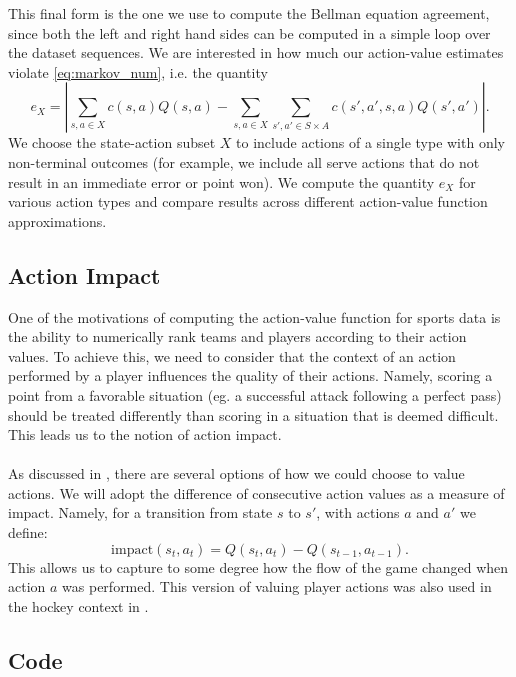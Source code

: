 \documentclass{sfuthesis}
\begin{document}
This final form is the one we use to compute the Bellman equation agreement, since both the left and right hand sides can be computed in a simple loop over the dataset sequences. We are interested in how much our action-value estimates violate \eqref{eq:markov_num}, i.e. the quantity
\begin{equation}
e_X = |\sum_{s,a\in X} c(s,a)Q(s,a) - \sum_{s,a\in X} \sum_{s',a'\in S\times A} c(s',a',s,a) Q(s',a') |.
\label{eq:markov_num2}
\end{equation}
We choose the state-action subset $X$ to include actions of a single type with only non-terminal outcomes (for example, we include all serve actions that do not result in an immediate error or point won). We compute the quantity $e_X$ for various action types and compare results across different action-value function approximations.

\section{Action Impact}

One of the motivations of computing the action-value function for sports data is the ability to numerically rank teams and players according to their action values. To achieve this, we need to consider that the context of an action performed by a player influences the quality of their actions. Namely, scoring a point from a favorable situation (eg. a successful attack following a perfect pass) should be treated differently than scoring in a situation that is deemed difficult. This leads us to the notion of action impact.\\\\
As discussed in \cite{routley2015markov}, there are several options of how we could choose to value actions. We will adopt the difference of consecutive action values as a measure of impact. Namely, for a transition from state $s$ to $s'$, with actions $a$ and $a'$ we define:
\begin{equation}
\text{impact}(s_t,a_t) = Q(s_t,a_t) - Q(s_{t-1},a_{t-1}).
\end{equation}
This allows us to capture to some degree how the flow of the game changed when action $a$ was performed. This version of valuing player actions was also used in the hockey context in \cite{liu2018deep}.

%
%
%
%
%

\backmatter%
	
	

\begin{appendices} %
	\chapter{Code}
\end{appendices}
\end{document}
